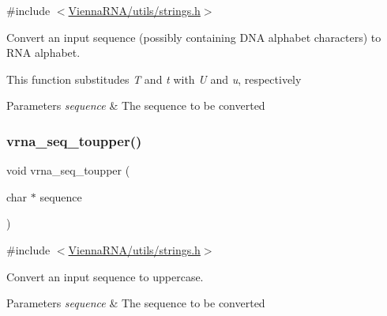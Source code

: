 {\ttfamily \#include $<$\hyperlink{strings_8h}{Vienna\+R\+N\+A/utils/strings.\+h}$>$}



Convert an input sequence (possibly containing D\+NA alphabet characters) to R\+NA alphabet. 

This function substitudes {\itshape T} and {\itshape t} with {\itshape U} and {\itshape u}, respectively


\begin{DoxyParams}{Parameters}
{\em sequence} & The sequence to be converted \\
\hline
\end{DoxyParams}
\mbox{\label{group__string__utils_ga4f44dca03c9d708d68e64c0610bb9091}} 
\subsubsection{\texorpdfstring{vrna\+\_\+seq\+\_\+toupper()}{vrna\_seq\_toupper()}}
{\footnotesize\ttfamily void vrna\+\_\+seq\+\_\+toupper (\begin{DoxyParamCaption}\item[{char $\ast$}]{sequence }\end{DoxyParamCaption})}



{\ttfamily \#include $<$\hyperlink{strings_8h}{Vienna\+R\+N\+A/utils/strings.\+h}$>$}



Convert an input sequence to uppercase. 


\begin{DoxyParams}{Parameters}
{\em sequence} & The sequence to be converted \\
\hline
\end{DoxyParams}
\mbox{\label{group__string__utils_ga0d031df5266328fe455e244e094634fd}} 
